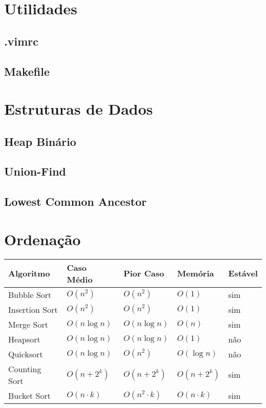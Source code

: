 \documentclass[12pt,a4paper]{article}
\begin{document}
	\twocolumn
	\tableofcontents
	\onecolumn

	\section{Utilidades}
		\subsection{.vimrc}
			
		\subsection{Makefile}
			
	
	\section{Estruturas de Dados}
		\subsection{Heap Binário}
			
		\subsection{Union-Find}
			
		\subsection{Lowest Common Ancestor}

	\section{Ordenação}
		\begin{tabular}{l l l l l}
			\bf{Algoritmo}	& \bf{Caso Médio}	& \bf{Pior Caso}	& \bf{Memória}	& \bf{Estável}	\\
			\hline
			Bubble Sort		& \(O(n^2)\)		& \(O(n^2)\)		& \(O(1)\)		& sim			\\
			Insertion Sort	& \(O(n^2)\)		& \(O(n^2)\)		& \(O(1)\)		& sim			\\
			Merge Sort		& \(O(n \log n)\)	& \(O(n \log n)\)	& \(O(n)\)		& sim			\\
			Heapsort		& \(O(n \log n)\)	& \(O(n \log n)\)	& \(O(1)\)		& não			\\
			Quicksort		& \(O(n \log n)\)	& \(O(n^2)\)		& \(O(\log n)\) & não			\\
			\hline
			Counting Sort	& \(O(n + 2^k)\)	& \(O(n + 2^k)\)	& \(O(n + 2^k)\) & sim			\\
			Bucket Sort		& \(O(n \cdot k)\)	& \(O(n^2\cdot k)\)	& \(O(n \cdot k)\) & sim			\\
		\end{tabular}
\end{document}
